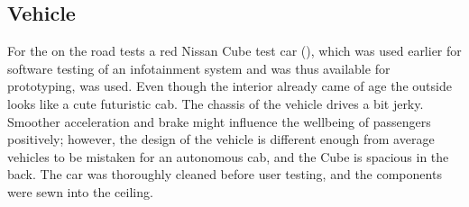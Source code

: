 \subsection{Vehicle}
For the on the road tests a red Nissan Cube test car (), which was used earlier for software testing of an infotainment system and was thus available for prototyping, was used. Even though the interior already came of age the outside looks like a cute futuristic cab. The chassis of the vehicle drives a bit jerky. Smoother acceleration and brake might influence the wellbeing of passengers positively; however, the design of the vehicle is different enough from average vehicles to be mistaken for an autonomous cab, and the Cube is spacious in the back. The car was thoroughly cleaned before user testing, and the components were sewn into the ceiling.

